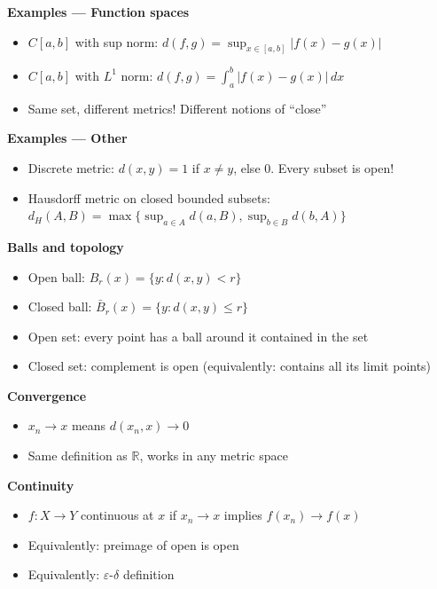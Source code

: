 \documentclass[
  10pt,
  letterpaper,
]{scrbook}
\providecommand{\tightlist}{%
  \setlength{\itemsep}{0pt}\setlength{\parskip}{0pt}}
\begin{document}
\textbf{Examples --- Function spaces}

\begin{itemize}
\tightlist
\item
  \(C[a,b]\) with sup norm:
  \(d(f,g) = \sup_{x \in [a,b]} |f(x) - g(x)|\)
\item
  \(C[a,b]\) with \(L^1\) norm: \(d(f,g) = \int_a^b |f(x) - g(x)|\, dx\)
\item
  Same set, different metrics! Different notions of ``close''
\end{itemize}

\textbf{Examples --- Other}

\begin{itemize}
\tightlist
\item
  Discrete metric: \(d(x,y) = 1\) if \(x \neq y\), else \(0\). Every
  subset is open!
\item
  Hausdorff metric on closed bounded subsets:
  \(d_H(A,B) = \max\{\sup_{a \in A} d(a,B), \sup_{b \in B} d(b,A)\}\)
\end{itemize}

\textbf{Balls and topology}

\begin{itemize}
\tightlist
\item
  Open ball: \(B_r(x) = \{y : d(x,y) < r\}\)
\item
  Closed ball: \(\bar{B}_r(x) = \{y : d(x,y) \leq r\}\)
\item
  Open set: every point has a ball around it contained in the set
\item
  Closed set: complement is open (equivalently: contains all its limit
  points)
\end{itemize}

\textbf{Convergence}

\begin{itemize}
\tightlist
\item
  \(x_n \to x\) means \(d(x_n, x) \to 0\)
\item
  Same definition as \(\mathbb{R}\), works in any metric space
\end{itemize}

\textbf{Continuity}

\begin{itemize}
\tightlist
\item
  \(f: X \to Y\) continuous at \(x\) if \(x_n \to x\) implies
  \(f(x_n) \to f(x)\)
\item
  Equivalently: preimage of open is open
\item
  Equivalently: \(\varepsilon\)-\(\delta\) definition
\end{itemize}
\end{document}
